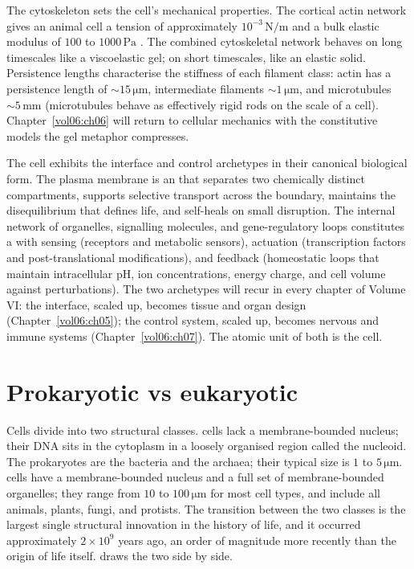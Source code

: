 

The cytoskeleton sets the cell's mechanical properties. The cortical
actin network gives an animal cell a tension of approximately
$10^{-3}\,\text{N}/\text{m}$ \cite{paper:v6c01-tinevez-2009} and a
bulk elastic modulus of $100$ to $1000\,\text{Pa}$
\cite{text:v6c01-howard-mechanics-2001}. The combined cytoskeletal
network behaves on long timescales like a viscoelastic gel; on short
timescales, like an elastic solid. Persistence lengths characterise
the stiffness of each filament class: actin has a persistence length
of $\sim 15\,\si{\micro\meter}$, intermediate filaments
$\sim 1\,\si{\micro\meter}$, and microtubules
$\sim 5\,\text{mm}$ (microtubules behave as effectively rigid rods on
the scale of a cell). Chapter~\ref{vol06:ch06} will return to cellular
mechanics with the constitutive models the gel metaphor compresses.

\begin{archetype}
The cell exhibits the interface and control archetypes in their
canonical biological form. The plasma membrane is an
 that separates two chemically distinct
compartments, supports selective transport across the boundary,
maintains the disequilibrium that defines life, and self-heals on
small disruption. The internal network of organelles, signalling
molecules, and gene-regulatory loops constitutes a
 with sensing (receptors and
metabolic sensors), actuation (transcription factors and post-translational
modifications), and feedback (homeostatic loops that maintain
intracellular pH, ion concentrations, energy charge, and cell volume
against perturbations). The two archetypes will recur in every
chapter of Volume VI: the interface, scaled up, becomes tissue and
organ design (Chapter~\ref{vol06:ch05}); the control system, scaled
up, becomes nervous and immune systems (Chapter~\ref{vol06:ch07}).
The atomic unit of both is the cell.
\end{archetype}

\section{Prokaryotic vs eukaryotic}

Cells divide into two structural classes.  cells
lack a membrane-bounded nucleus; their DNA sits in the cytoplasm in a
loosely organised region called the nucleoid. The prokaryotes are the
bacteria and the archaea; their typical size is $1$ to
$5\,\si{\micro\meter}$.  cells have a
membrane-bounded nucleus and a full set of membrane-bounded organelles;
they range from $10$ to $100\,\si{\micro\meter}$ for most cell types,
and include all animals, plants, fungi, and protists. The transition
between the two classes is the largest single structural innovation in
the history of life, and it occurred approximately $2 \times 10^9$
years ago, an order of magnitude more recently than the origin of life
itself.  draws the two
side by side.

